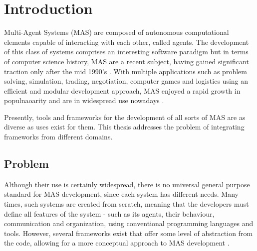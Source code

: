 \chapter{Introduction}
\label{chap:introduction}
Multi-Agent Systems (MAS) are composed of autonomous computational elements capable of interacting with each other, called agents. The development of this class of systems comprises an interesting software paradigm but in terms of computer science history, MAS are a recent subject, having gained significant traction only after the mid 1990's \cite{wooldridge2008introduction}. With multiple applications such as problem solving, simulation, trading, negotiation, computer games and logistics using an efficient and modular development approach, MAS enjoyed a rapid growth in populnaoarity and are in widespread use nowadays \cite{ferber1999multi}.

Presently, tools and frameworks for the development of all sorts of MAS are as diverse as uses exist for them. This thesis addresses the problem of integrating frameworks from different domains.

\section{Problem}

Although their use is certainly widespread, there is no universal general purpose standard for MAS development, since each system has different needs. Many times, such systems are created from scratch, meaning that the developers must define all features of the system - such as its agents, their behaviour, communication and organization, using conventional programming languages and tools. However, several frameworks exist that offer some level of abstraction from the code, allowing for a more conceptual approach to MAS development \cite{survey2}. 

